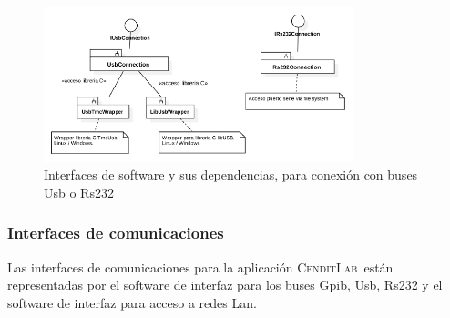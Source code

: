 \documentclass[paper=a4,oneside,fontsize=12pt]{article}
\newcommand{\AppName}{\textsc{CenditLab}\ }
\begin{document}
	\begin{figure}[H]
		\centering
		\includegraphics[width=0.8\textwidth]{Imagenes/CommunicationAbstractionLayerPackages3.pdf}
		\caption{Interfaces de software y sus dependencias, para conexión con buses Usb o Rs232}
		\label{Fig:CalPackages2}		
	\end{figure}
	
	\subsubsection{Interfaces de comunicaciones}
	
	Las interfaces de comunicaciones para la aplicación \AppName están representadas por el software de interfaz para los buses Gpib, Usb, Rs232 y el software de interfaz para acceso a redes Lan.
	
	
		\newcommand{\funcreq}[7]{
			\subsubsection{Requerimiento funcional {#1}}

			\begin{table}[H]			
				\begin{tabularx}{\textwidth}{rX}			
					\textbf{ID:} 	&	{#2}		\\
					Titulo:			&  	{#3}. 		\\
					Descripción:	&	{#4}.		\\
					Justificación: 	&	{#5}.		\\
					Dependencias:	& 	{#6}.		\\
					Usuario:		&	{#7}.		\\
				\end{tabularx}				
			\end{table}
		}
		
\end{document}

